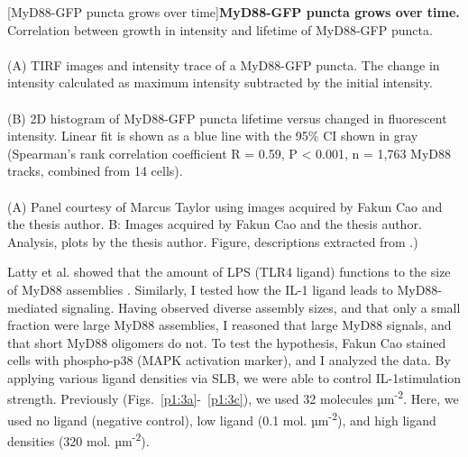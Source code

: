 \begin{centering}
\captionsetup{parbox=none}
[MyD88-GFP puncta grows over time]{\textbf{MyD88-GFP puncta grows over time.} Correlation between growth in intensity and lifetime of MyD88-GFP puncta.
\\
\\
(A) TIRF images and intensity trace of a MyD88-GFP puncta. The change in intensity calculated as maximum intensity subtracted by the initial intensity.
\\
\\
(B) 2D histogram of MyD88-GFP puncta lifetime versus changed in fluorescent intensity. Linear fit is shown as a blue line with the 95\% CI shown in gray (Spearman’s rank correlation coefficient R = 0.59, P < 0.001, n = 1,763 MyD88 tracks, combined from 14 cells).
\\
\\
(A) Panel courtesy of Marcus Taylor using images acquired by Fakun Cao and the thesis author. B: Images acquired by Fakun Cao and the thesis author. Analysis, plots by the thesis author. Figure, descriptions extracted from \autocite{Deliz-Aguirre_2021}.)}
\label{p1:3c}
\end{centering}

Latty et al. showed that the amount of LPS (TLR4 ligand) functions to the size of MyD88 assemblies \autocite{Latty_2018}. Similarly, I tested how the IL-1 ligand leads to MyD88-mediated signaling. Having observed diverse assembly sizes, and that only a small fraction were large MyD88 assemblies, I reasoned that large MyD88 signals, and that short MyD88 oligomers do not. To test the hypothesis, Fakun Cao stained cells with phospho-p38 (MAPK activation marker), and I analyzed the data. By applying various ligand densities via SLB, we were able to control IL-1\textbeta stimulation strength. Previously (Figs.~\ref{p1:3a}-~\ref{p1:3c}), we used 32 molecules µm\textsuperscript{-2}. Here, we used no ligand (negative control), low ligand (0.1 mol. µm\textsuperscript{-2}), and high ligand densities (320 mol. µm\textsuperscript{-2}). 

